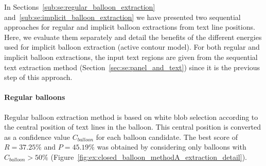 In Sections~\ref{sub:se:regular_balloon_extraction} and~\ref{sub:se:implicit_balloon_extraction} we have presented two sequential approaches for regular and implicit balloon extractions from text line positions.
Here, we evaluate them separately and detail the benefits of the different energies used for implicit balloon extraction (active contour model).
For both regular and implicit balloon extractions, the input text regions are given from the sequential text extraction method (Section~\ref{sec:se:panel_and_text}) since it is the previous step of this approach.

\paragraph{Regular balloons} %
\label{par:regular_balloons}

Regular balloon extraction method is based on white blob selection according to the central position of text lines in the balloon.
This central position is converted as a confidence value $C_{balloon}$ for each balloon candidate.
The best score of $R=37.25\%$ and $P=45.19\%$ was obtained by considering only balloons with $C_{balloon} > 50\%$ (Figure~\ref{fig:ex:closed_balloon_methodA_extraction_detail}).






